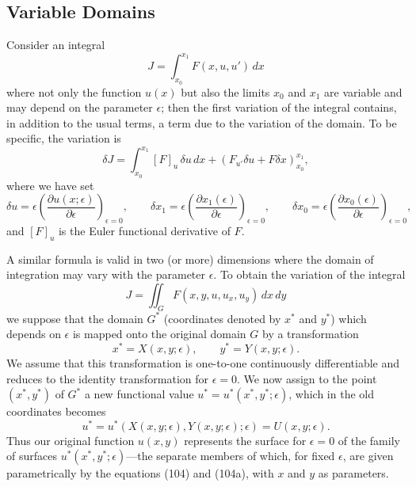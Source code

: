 \subsection{Variable Domains}
Consider an integral
\[
J=\int_{x_0}^{x_1}F(x,u,u')\,dx
\]
where not only the function $u(x)$ but also the limits $x_0$ and $x_1$ are variable and may depend on the parameter $\epsilon$; then the first variation of the integral contains, in addition to the usual terms, a term due to the variation of the domain. To be specific, the variation is
\begin{equation}\tag{103}
\delta J=\int_{x_0}^{x_1}[F]_u\,\delta u\,dx
+\left(F_{u'}\delta u+F\delta x\right)_{x_0}^{x_1},
\end{equation}
where we have set
\[
\delta u=\epsilon\left(\frac{\partial u(x;\epsilon)}{\partial\epsilon}\right)_{\epsilon=0},\qquad
\delta x_1=\epsilon\left(\frac{\partial x_1(\epsilon)}{\partial\epsilon}\right)_{\epsilon=0},\qquad
\delta x_0=\epsilon\left(\frac{\partial x_0(\epsilon)}{\partial\epsilon}\right)_{\epsilon=0},
\]
and $[F]_u$ is the Euler functional derivative of $F$.

A similar formula is valid in two (or more) dimensions where the domain of integration may vary with the parameter $\epsilon$. To obtain the variation of the integral
\[
J=\iint_G F(x,y,u,u_x,u_y)\,dx\,dy
\]
we suppose that the domain $G^*$ (coordinates denoted by $x^*$ and $y^*$) which depends on $\epsilon$ is mapped onto the original domain $G$ by a transformation
\begin{equation}\tag{104}
 x^*=X(x,y;\epsilon),\qquad y^*=Y(x,y;\epsilon).
\end{equation}
We assume that this transformation is one-to-one continuously differentiable and reduces to the identity transformation for $\epsilon=0$. We now assign to the point $(x^*,y^*)$ of $G^*$ a new functional value $u^*=u^*(x^*,y^*;\epsilon)$, which in the old coordinates becomes
\begin{equation}\tag{104a}
u^*=u^*(X(x,y;\epsilon),Y(x,y;\epsilon);\epsilon)=U(x,y;\epsilon).
\end{equation}
Thus our original function $u(x,y)$ represents the surface for $\epsilon=0$ of the family of surfaces $u^*(x^*,y^*;\epsilon)$---the separate members of which, for fixed $\epsilon$, are given parametrically by the equations (104) and (104a), with $x$ and $y$ as parameters.

